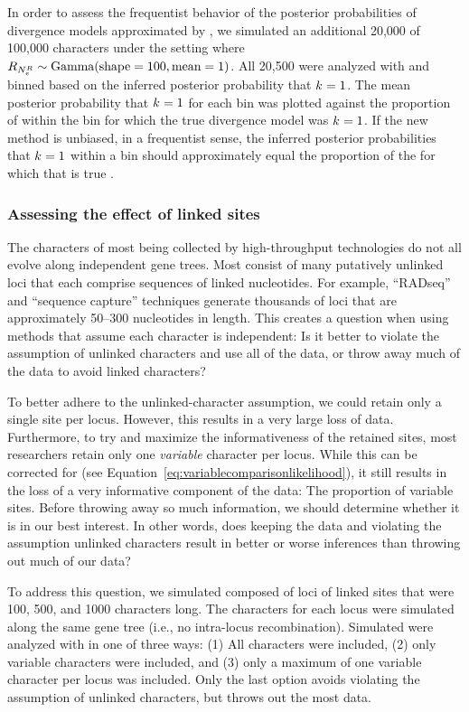 In order to assess the frequentist behavior of the posterior probabilities of
divergence models approximated by \ecoevolity, we simulated an additional
20,000 \datasets of 100,000 characters under the setting where
$R_{N_{e}^{R{}}} \sim \textrm{Gamma}(\textrm{shape} = 100, \textrm{mean} = 1)$.
All 20,500 \datasets were analyzed with \ecoevolity and binned based on the
inferred posterior probability that $k_{}{} = 1$.
The mean posterior probability that $k_{}{} = 1$ for each bin was plotted
against the proportion of \datasets within the bin for which the true
divergence model was $k_{}{} = 1$.
If the new method is unbiased, in a frequentist sense, the inferred posterior
probabilities that $k_{}{} = 1$ within a bin should approximately equal the
proportion of the \datasets for which that is true
\citep{Huelsenbeck2004,Oaks2012,Oaks2014dpp}.

\subsubsection{Assessing the effect of linked sites}
The characters of most \datasets being collected by high-throughput technologies
do not all evolve along independent gene trees.
Most consist of many putatively unlinked loci that each comprise sequences of
linked nucleotides.
For example, ``RADseq'' and ``sequence capture'' techniques generate thousands
of loci that are approximately 50--300 nucleotides in length.
This creates a question when using methods that assume each character is
independent:
Is it better to violate the assumption of unlinked characters and use all of
the data, or throw away much of the data to avoid linked characters?

To better adhere to the unlinked-character assumption, we could retain only a
single site per locus.
However, this results in a very large loss of data.
Furthermore, to try and maximize the informativeness of the retained sites,
most researchers retain only one \emph{variable} character per locus.
While this can be corrected for (see
Equation~\ref{eq:variablecomparisonlikelihood}), it still results in the loss
of a very informative component of the data: The proportion of variable sites.
Before throwing away so much information, we should determine whether
it is in our best interest.
In other words, does keeping the data and violating the assumption unlinked
characters result in better or worse inferences than throwing out much of our
data?

To address this question, 
we simulated \datasets composed of loci of linked sites that were 100, 500, and
1000 characters long.
The characters for each locus were simulated along the same gene tree (i.e., no
intra-locus recombination).
Simulated \datasets were analyzed with \ecoevolity in one of three ways:
(1) All characters were included,
(2) only variable characters were included,
and
(3) only a maximum of one variable character per locus was included.
Only the last option avoids violating the assumption of unlinked characters,
but throws out the most data.

